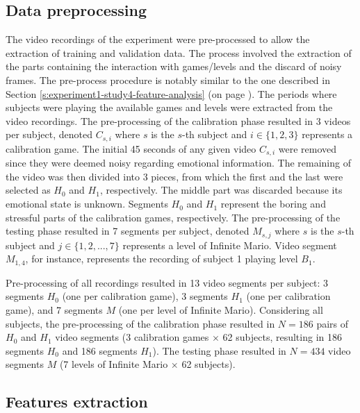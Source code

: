 \subsection{Data preprocessing}

The video recordings of the experiment were pre-processed to allow the extraction of training and validation data. The process involved the extraction of the parts containing the interaction with games/levels and the discard of noisy frames. The pre-process procedure is notably similar to the one described in Section \ref{s:experiment1-study4-feature-analysis} (on page \pageref{s:experiment1-study4-feature-analysis}). The periods where subjects were playing the available games and levels were extracted from the video recordings. The pre-processing of the calibration phase resulted in 3 videos per subject, denoted $C_{s,i}$ where $s$ is the $s$-th subject and $i \in \{1, 2, 3\}$ represents a calibration game. The initial 45 seconds of any given video $C_{s,i}$ were removed since they were deemed noisy regarding emotional information. The remaining of the video was then divided into 3 pieces, from which the first and the last were selected as $H_0$ and $H_1$, respectively. The middle part was discarded because its emotional state is unknown. Segments $H_0$ and $H_1$ represent the boring and stressful parts of the calibration games, respectively. The pre-processing of the testing phase resulted in 7 segments per subject, denoted $M_{s,j}$ where $s$ is the $s$-th subject and $j \in \{1, 2, ..., 7\}$ represents a level of Infinite Mario. Video segment $M_{1,4}$, for instance, represents the recording of subject 1 playing level $B_1$.

Pre-processing of all recordings resulted in 13 video segments per subject: 3 segments $H_0$ (one per calibration game), 3 segments $H_1$ (one per calibration game), and 7 segments $M$ (one per level of Infinite Mario). Considering all subjects, the pre-processing of the calibration phase resulted in $N=186$ pairs of $H_0$ and $H_1$ video segments (3 calibration games $\times$ 62 subjects, resulting in 186 segments $H_0$ and 186 segments $H_1$). The testing phase resulted in $N=434$ video segments $M$ (7 levels of Infinite Mario $\times$ 62 subjects).

\subsection{Features extraction}

